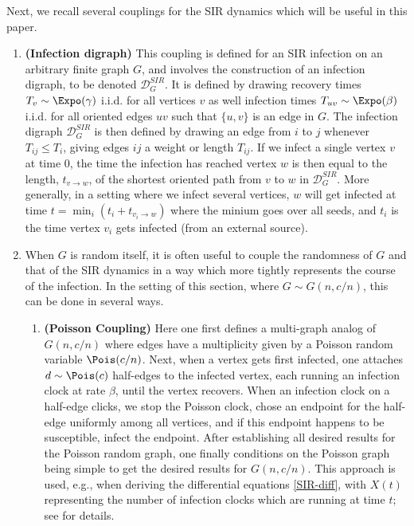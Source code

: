 \documentclass[11pt]{article}
\begin{document}
Next, we recall several couplings for the SIR dynamics which will be useful in this paper.




\begin{enumerate}
\item \textbf{(Infection digraph)} \label{D-SIR-couplings}
This coupling is defined for an SIR infection on an arbitrary finite graph $G$, and involves the construction of an  infection digraph, to be denoted $\mathcal D_G^{SIR}$.  It is defined by drawing  recovery times $T_v\sim \Expo(\gamma)$ i.i.d. for all vertices $v$ as well infection times $T_{uv}\sim \Expo(\beta)$ i.i.d. for all  oriented edges $uv$ such that $\{u,v\}$ is an edge in $G$.  The infection digraph $\mathcal D_G^{SIR}$ is then defined by drawing an edge from $i$ to $j$ whenever $T_{ij}\leq T_i$, giving edges $ij$ a weight or length $T_{ij}$.   If we infect a single vertex $v$ at time $0$, the time the infection has reached vertex $w$ is then equal to the length, $t_{v\to w}$, of the shortest oriented path from $v$ to $w$ in $\mathcal D_G^{SIR}$.  More generally, in a setting where we infect several vertices, $w$  will get infected at time $t=\min_i(t_i+ t_{v_i\to w})$ where the minium goes over all seeds, and $t_i$ is the time vertex $v_i$ gets infected (from an external source).  

\item When $G$ is random itself, it is often useful to couple the randomness of $G$ and that of the SIR dynamics in a way which more tightly represents the course of the infection.  In the setting of this section, where
$G\sim G(n,c/n)$, this can be done in several ways.  
\begin{enumerate}
    \item {\bf(Poisson Coupling)} Here one first defines a multi-graph analog of $G(n,c/n)$ where edges have a multiplicity given by a Poisson random variable $\Pois(c/n)$.   Next, when a vertex gets first infected, one  attaches 
    $d\sim \Pois(c)$ half-edges to the infected vertex, each running an infection clock at rate $\beta$, until the vertex recovers.  When an infection clock on a half-edge clicks, we stop the Poisson clock, chose an endpoint for the half-edge uniformly among all vertices, and if this endpoint happens to be susceptible, infect the endpoint.  After establishing all desired results for the Poisson random graph, one finally conditions on the Poisson graph being simple to get the desired results for  $G(n,c/n)$.  This approach is used, e.g., when deriving the differential equations \eqref{SIR-diff}, with $X(t)$ representing the number of infection clocks which are running at time $t$; see \cite{ball2020epidemics,borgs2024lawlargenumberssir} for details.


\end{enumerate}
\end{enumerate}
\end{document}
